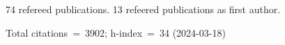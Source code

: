 74 refereed publications. 13 refeered publications as first author.

Total citations~=~3902; h-index~=~34 (2024-03-18)